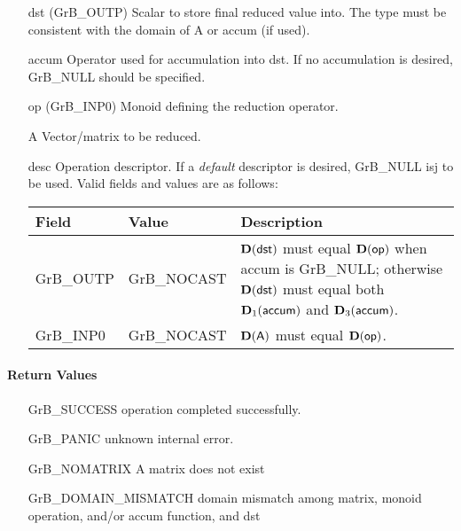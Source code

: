 \begin{itemize}[leftmargin=1.1in]
    \item[{\sf dst}]    ({\sf GrB\_OUTP}) Scalar to store final reduced value into.  The type must be
                        consistent with the domain of {\sf A} or {\sf accum} (if used).

    \item[{\sf accum}]  Operator used for accumulation into {\sf dst}.  If no accumulation
                        is desired, {\sf GrB\_NULL} should be specified.

    \item[{\sf op}]     ({\sf GrB\_INP0}) Monoid defining the reduction operator.
    \item[{\sf A}]    Vector/matrix to be reduced.

    \item[{\sf desc}]   Operation descriptor. If a
    \emph{default} descriptor is desired, {\sf GrB\_NULL} isj to be
    used.  Valid fields and values are as follows: \\
    \begin{tabular}{llp{3in}}
    Field  & Value & Description \\
    \hline
    {\sf GrB\_OUTP} & {\sf GrB\_NOCAST} & $\bold{D}({\sf dst})$ must equal $\bold{D}({\sf op})$ when
                                          {\sf accum} is {\sf GrB\_NULL}; otherwise $\bold{D}({\sf dst})$
                                          must equal both $\bold{D}_1({\sf accum})$ and $\bold{D}_3({\sf accum})$. \\
    {\sf GrB\_INP0} & {\sf GrB\_NOCAST} & $\bold{D}({\sf A})$ must equal $\bold{D}({\sf op})$.\\
    \end{tabular}
\end{itemize}

\paragraph{Return Values}

\begin{itemize}[leftmargin=2.1in]
\item[{\sf GrB\_SUCCESS}]             operation completed successfully.
\item[{\sf GrB\_PANIC}]               unknown internal error.
\item[{\sf GrB\_NOMATRIX}]   {\sf A} matrix does not exist
\item[{\sf GrB\_DOMAIN\_MISMATCH}]  
        domain mismatch among matrix, monoid operation, and/or
        accum function, and {\sf dst} 
\end{itemize}

